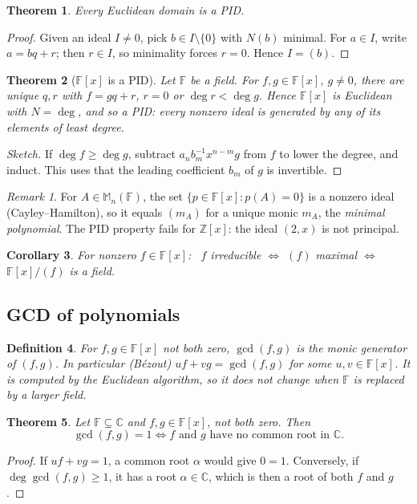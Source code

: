 \documentclass[12pt]{article}
\theoremstyle{breakplain}
\newtheorem{theorem}{Theorem}[section]
\newtheorem{corollary}[theorem]{Corollary}
\theoremstyle{breakdef}
\newtheorem{definition}[theorem]{Definition}
\theoremstyle{remark}
\newtheorem*{remark}{Remark}
\begin{document}
\begin{theorem}
Every Euclidean domain is a PID.
\end{theorem}
\begin{proof}
Given an ideal $I\neq0$, pick $b\in I\setminus\{0\}$ with $N(b)$ minimal. For $a\in I$, write $a=bq+r$;
then $r\in I$, so minimality forces $r=0$. Hence $I=(b)$.
\end{proof}
 
\begin{theorem}[{$\mathbb{F}[x]$ is a PID}]
Let $\mathbb{F}$ be a field. For $f,g\in \mathbb{F}[x]$, $g\neq0$, there are unique $q,r$ with $f=gq+r$, $r=0$ or $\deg r<\deg g$.
Hence $\mathbb{F}[x]$ is Euclidean with $N=\deg$, and so a PID: every nonzero ideal is generated by any of its
elements of least degree.
\end{theorem}
\begin{proof}[Sketch]
If $\deg f\ge\deg g$, subtract $a_nb_m^{-1}x^{n-m}g$ from $f$ to lower the degree, and induct.
This uses that the leading coefficient $b_m$ of $g$ is invertible.
\end{proof}
 
\begin{remark}
For $A\in \mathbb{M}_n(\mathbb{F})$, the set $\{p\in \mathbb{F}[x]: p(A)=0\}$ is a nonzero ideal (Cayley--Hamilton), so it equals
$(m_A)$ for a unique monic $m_A$, the \emph{minimal polynomial}. The PID property fails for $\mathbb{Z}[x]$:
the ideal $(2,x)$ is not principal.
\end{remark}
 
\begin{corollary}
For nonzero $f\in \mathbb{F}[x]$: \ $f$ irreducible $\iff$ $(f)$ maximal $\iff$ $\mathbb{F}[x]/(f)$ is a field.
\end{corollary}
 
\subsection*{GCD of polynomials}
 
\begin{definition}
For $f,g\in \mathbb{F}[x]$ not both zero, $\gcd(f,g)$ is the monic generator of $(f,g)$. In particular
(B\'ezout) $uf+vg=\gcd(f,g)$ for some $u,v\in \mathbb{F}[x]$. It is computed by the Euclidean algorithm,
so it does not change when $\mathbb{F}$ is replaced by a larger field.
\end{definition}
 
\begin{theorem}
Let $\mathbb{F}\subseteq\mathbb{C}$ and $f,g\in \mathbb{F}[x]$, not both zero. Then
\[
\gcd(f,g)=1 \iff f \text{ and } g \text{ have no common root in } \mathbb{C}.
\]
\end{theorem}
\begin{proof}
If $uf+vg=1$, a common root $\alpha$ would give $0=1$. Conversely, if $\deg\gcd(f,g)\ge1$, it has a
root $\alpha\in\mathbb{C}$, which is then a root of both $f$ and $g$.
\end{proof}
 
\end{document}
